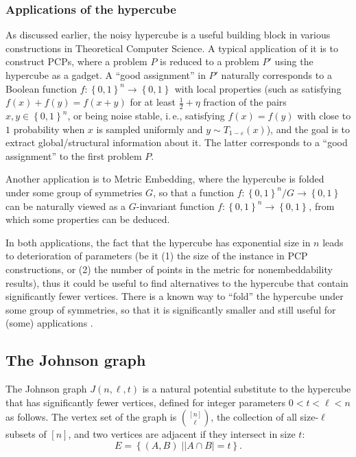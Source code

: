 \documentclass[11pt]{article}
\newcommand{\ie}{i.\,e.}
\newcommand\card[1]{\left| {#1} \right|}
\newcommand\sett[2]{\left\{ \left. #1 \;\right\vert #2 \right\}}
\newcommand\set[1]{{\left\{ #1 \right\}}}
\newcommand\power[1]{\set{0,1}^{#1}}
\newcommand\half{\frac{1}{2}}
\newcommand\eps{\varepsilon}
\begin{document}
\subsubsection{Applications of the hypercube} %
As discussed earlier, the noisy hypercube is a useful building block in various constructions in Theoretical Computer Science. A typical application of it
is to construct PCPs, where a problem $P$ is reduced to a problem $P'$ using the hypercube as a gadget.
A ``good assignment'' in $P'$ naturally corresponds to a Boolean function $f\colon\power{n}\to\power{}$ with local properties (such as
satisfying $f(x) + f(y) = f(x+y)$ for at least $\half + \eta$ fraction of the pairs $x,y\in\power{n}$, or being noise stable, \ie, satisfying $f(x) = f(y)$
with close to $1$ probability when $x$ is sampled uniformly and $y\sim T_{1-\eps}(x)$), and the goal is to extract global/structural information about it.
The latter corresponds to a ``good assignment'' to the first problem $P$.

Another application is to Metric Embedding, where the hypercube is folded under some group of symmetries $G$, so that a function $f\colon \power{n}/ G\to\power{}$
can be naturally viewed as a $G$-invariant function $f\colon\power{n}\to\power{}$, from which some properties can be deduced.

In both applications, the fact that the hypercube has exponential size in $n$ leads to deterioration of parameters (be it (1) the size of the instance in PCP constructions,
or (2) the number of points in the metric for nonembeddability results),
thus it could be useful to find alternatives to the hypercube that contain significantly
%
fewer  %
vertices. There is a known way \cite{BGHMRS}
to ``fold'' the hypercube under some group of symmetries, so that it is significantly smaller and still useful
for (some) %
applications  %
 \cite{kane2013prg,dinur2015pcps}.
%
%
%
%
%
%
%

\subsection{The Johnson graph}
The Johnson graph $J(n,\ell,t)$ %
is a natural potential substitute to the hypercube that has significantly fewer vertices,
defined for integer parameters $0<t<\ell<n$ as follows.
The vertex set of the graph is $\binom{[n]}{\ell}$, the collection of all
%
size-$\ell$   %
subsets of $[n]$,
and two vertices are %
adjacent  %
if they intersect in size $t$:
\[
  E = \sett{(A,B)}{\card{A\cap B} = t}.
\]
\end{document}
